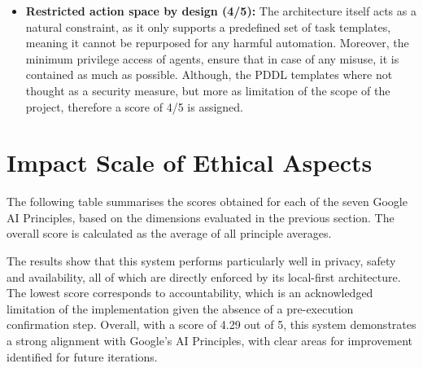 \begin{enumerate}
    \begin{itemize}
        \item \textbf{Restricted action space by design (4/5):} The architecture
        itself acts as a natural constraint, as it only supports a predefined set
        of task templates, meaning it cannot be repurposed for any harmful
        automation. Moreover, the minimum privilege access of agents, ensure that
        in case of any misuse, it is contained as much as possible. Although, the
        PDDL templates where not thought as a security measure, but more as
        limitation of the scope of the project, therefore a score of 4/5 is
        assigned.
    \end{itemize}

\end{enumerate}

\section{Impact Scale of Ethical Aspects}

The following table summarises the scores obtained for each of the seven Google AI Principles, based on the dimensions evaluated in the previous section. The overall score is calculated as the average of all principle averages.

\begin{table}[h]
\centering
{}
\caption{Summary of Google AI Principles scores.}
\end{table}

The results show that this system performs particularly well in privacy, safety and availability, all of which are directly enforced by its local-first architecture. The lowest score corresponds to accountability, which is an acknowledged limitation of the implementation given the absence of a pre-execution confirmation step. Overall, with a score of 4.29 out of 5, this system demonstrates a strong alignment with Google's AI Principles, with clear areas for improvement identified for future iterations.
